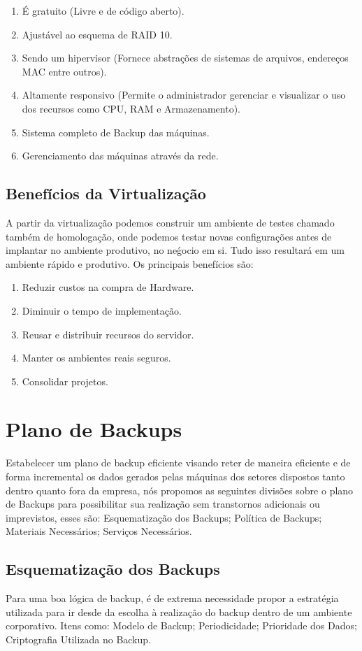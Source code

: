 \documentclass[12pt]{article}
\begin{document}
\begin{enumerate}
    \item É gratuito (Livre e de código aberto).
    \item Ajustável ao esquema de RAID 10.
    \item Sendo um hipervisor (Fornece abstrações de sistemas de arquivos, endereços MAC entre outros).
    \item Altamente responsivo (Permite o administrador gerenciar e visualizar o uso dos recursos como CPU, RAM e Armazenamento).
    \item Sistema completo de Backup das máquinas.
    \item Gerenciamento das máquinas através da rede.
\end{enumerate}

\subsection{Benefícios da Virtualização}
A partir da virtualização podemos construir um ambiente de testes chamado também de homologação, onde podemos testar novas configurações antes de implantar no ambiente produtivo, no neǵocio em si. Tudo isso resultará em um ambiente rápido e produtivo. Os principais benefícios são:

\begin{enumerate}
    \item Reduzir custos na compra de Hardware.
    \item Diminuir o tempo de implementação.
    \item Reusar e distribuir recursos do servidor.
    \item Manter os ambientes reais seguros.
    \item Consolidar projetos.
\end{enumerate}

\section{Plano de Backups}
Estabelecer um plano de backup eficiente visando reter de maneira eficiente e de forma incremental os dados gerados pelas máquinas dos setores dispostos tanto dentro quanto fora da empresa, nós propomos as seguintes divisões sobre o plano de Backups para possibilitar sua realização sem transtornos adicionais ou imprevistos, esses são: Esquematização dos Backups; Política de Backups; Materiais Necessários; Serviços Necessários.

\subsection{Esquematização dos Backups}
Para uma boa lógica de backup, é de extrema necessidade propor a estratégia utilizada para ir desde da escolha à realização do backup dentro de um ambiente corporativo. Itens como: Modelo de Backup; Periodicidade; Prioridade dos Dados; Criptografia Utilizada no Backup.
\end{document}
